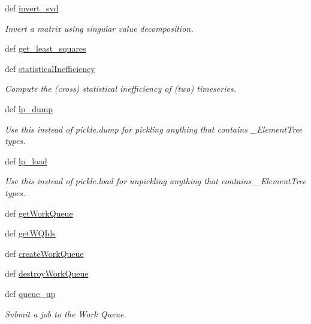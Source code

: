 \begin{DoxyCompactItemize}
def \hyperlink{namespaceforcebalance_1_1nifty_a4c82187e92dfeb8a159f4aa44b501c40}{invert\-\_\-svd}
\begin{DoxyCompactList}\small\item\em Invert a matrix using singular value decomposition. \end{DoxyCompactList}\item 
def \hyperlink{namespaceforcebalance_1_1nifty_aa9fb9c7c65231eca50a7afc04f489b64}{get\-\_\-least\-\_\-squares}
\item 
def \hyperlink{namespaceforcebalance_1_1nifty_ad5ca60565c864b4245a8212fe9d92e10}{statistical\-Inefficiency}
\begin{DoxyCompactList}\small\item\em Compute the (cross) statistical inefficiency of (two) timeseries. \end{DoxyCompactList}\item 
def \hyperlink{namespaceforcebalance_1_1nifty_a2ff762a2f2d2b6bb1c7dd067bd1a1e88}{lp\-\_\-dump}
\begin{DoxyCompactList}\small\item\em Use this instead of pickle.\-dump for pickling anything that contains \-\_\-\-Element\-Tree types. \end{DoxyCompactList}\item 
def \hyperlink{namespaceforcebalance_1_1nifty_a577abfd36638c5f4dfdade136abaef12}{lp\-\_\-load}
\begin{DoxyCompactList}\small\item\em Use this instead of pickle.\-load for unpickling anything that contains \-\_\-\-Element\-Tree types. \end{DoxyCompactList}\item 
def \hyperlink{namespaceforcebalance_1_1nifty_ac37d4fe58ef70ed546ebfc45d12f7a5d}{get\-Work\-Queue}
\item 
def \hyperlink{namespaceforcebalance_1_1nifty_abe1e72c32252d62a6551b47290c7584f}{get\-W\-Q\-Ids}
\item 
def \hyperlink{namespaceforcebalance_1_1nifty_ab5f3072ad95e9c75659cb1adac341051}{create\-Work\-Queue}
\item 
def \hyperlink{namespaceforcebalance_1_1nifty_a09605ee2819749913bbbb6206af1af70}{destroy\-Work\-Queue}
\item 
def \hyperlink{namespaceforcebalance_1_1nifty_a673f4a044169f5d8d822823989a836a7}{queue\-\_\-up}
\begin{DoxyCompactList}\small\item\em Submit a job to the Work Queue. \end{DoxyCompactList}\item 

\end{DoxyCompactItemize}
